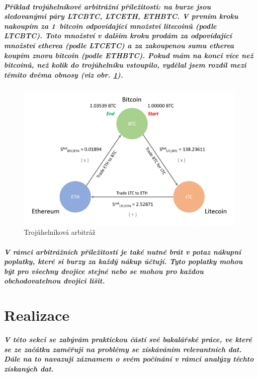 \documentclass[thesis=B,czech]{FITthesis}[2019/03/21]
\begin{document}
\paragraph{
Příklad trojúhelníkové arbitrážní příležitosti: na burze jsou sledovanými páry LTCBTC, LTCETH, ETHBTC. V prvním kroku nakoupím za 1~bitcoin odpovídající množství litecoinů (podle LTCBTC). Toto množství v dalším kroku prodám za odpovídající množství etherea (podle LTCETC) a za zakoupenou sumu etherea koupím znovu bitcoin (podle ETHBTC). Pokud mám na konci více než bitcoinů, než kolik do trojúhelníku vstoupilo, vydělal jsem rozdíl mezi těmito dvěma obnosy (viz obr. \ref{triangle_arbitrage}).
}
\begin{figure}\centering
	\includegraphics[width=1\textwidth]{images/ZMENIT-triangle.png}
	\caption{Trojúhelníková arbitráž}\label{triangle_arbitrage}
\end{figure}
\paragraph{
V rámci arbitrážních příležitostí je také nutné brát v potaz nákupní poplatky, které si burzy za každý nákup účtují. Tyto poplatky mohou být pro všechny dvojice stejné nebo se mohou pro každou obchodovatelnou dvojici lišit.  
}

\chapter{Realizace}
\paragraph{
V této sekci se zabývám praktickou částí své bakalářské práce, ve které se ze začátku zaměřuji na problémy se získáváním relevantních dat. Dále na to navazuji záznamem o svém počínání v rámci analýzy těchto získaných dat. 
}
\end{document}
